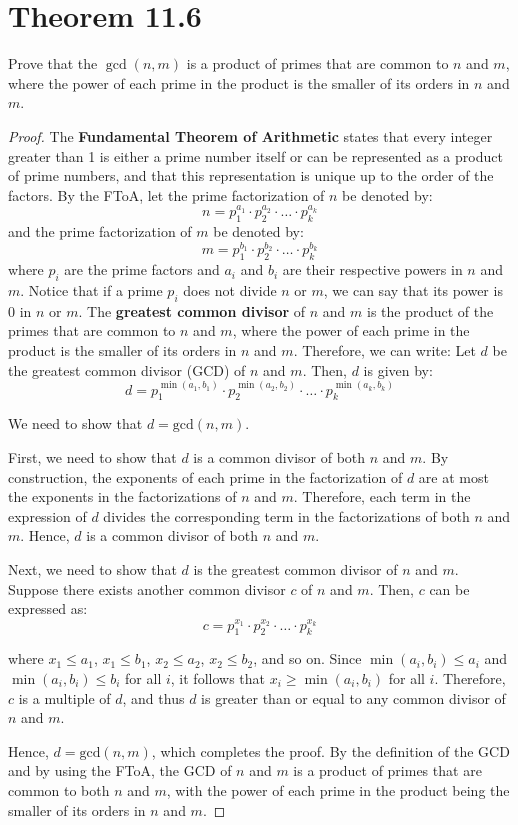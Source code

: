 \documentclass{article}
\renewcommand{\_}{\ifincsname_\else\legacyunderscore\fi}
\begin{document}
\section{Theorem 11.6}

    Prove that the $\gcd(n, m)$ is a product of primes that are common to $n$ and $m$, where the power of each prime in the product is the smaller of its orders in $n$ and $m$.

    \begin{proof}
        The \textbf{Fundamental Theorem of Arithmetic} states that every integer greater than 1 is either a prime number itself or can be represented as a product of prime numbers, and that this representation is unique up to the order of the factors. By the FToA, let the prime factorization of $n$ be denoted by:
        \[n=p_{1}^{a_1}\cdot p_{2}^{a_2}\cdot \hdots \cdot p_{k}^{a_k}\]
        and the prime factorization of $m$ be denoted by:
        \[m=p_{1}^{b_1}\cdot p_{2}^{b_2}\cdot \hdots \cdot p_{k}^{b_k}\]
        where $p_i$ are the prime factors and $a_i$ and $b_i$ are their respective powers in $n$ and $m$. Notice that if a prime $p_i$ does not divide $n$ or $m$, we can say that its power is $0$ in $n$ or $m$. The \textbf{greatest common divisor} of $n$ and $m$ is the product of the primes that are common to $n$ and $m$, where the power of each prime in the product is the smaller of its orders in $n$ and $m$. Therefore, we can write:
        Let $d$ be the greatest common divisor (GCD) of $n$ and $m$. Then, $d$ is given by:
\[
d = p_1^{\min(a_1, b_1)} \cdot p_2^{\min(a_2, b_2)} \cdot \ldots \cdot p_k^{\min(a_k, b_k)}
\]

We need to show that $d = \text{gcd}(n, m)$.

First, we need to show that $d$ is a common divisor of both $n$ and $m$. By construction, the exponents of each prime in the factorization of $d$ are at most the exponents in the factorizations of $n$ and $m$. Therefore, each term in the expression of $d$ divides the corresponding term in the factorizations of both $n$ and $m$. Hence, $d$ is a common divisor of both $n$ and $m$.

Next, we need to show that $d$ is the greatest common divisor of $n$ and $m$. Suppose there exists another common divisor $c$ of $n$ and $m$. Then, $c$ can be expressed as:
\[
c = p_1^{x_1} \cdot p_2^{x_2} \cdot \ldots \cdot p_k^{x_k}
\]

where $x_1 \leq a_1$, $x_1 \leq b_1$, $x_2 \leq a_2$, $x_2 \leq b_2$, and so on. Since $\min(a_i, b_i) \leq a_i$ and $\min(a_i, b_i) \leq b_i$ for all $i$, it follows that $x_i \geq \min(a_i, b_i)$ for all $i$. Therefore, $c$ is a multiple of $d$, and thus $d$ is greater than or equal to any common divisor of $n$ and $m$.

Hence, $d = \text{gcd}(n, m)$, which completes the proof. By the definition of the GCD and by using the FToA, the GCD of $n$ and $m$ is a product of primes that are common to both $n$ and $m$, with the power of each prime in the product being the smaller of its orders in $n$ and $m$.

    \end{proof}
\end{document}

